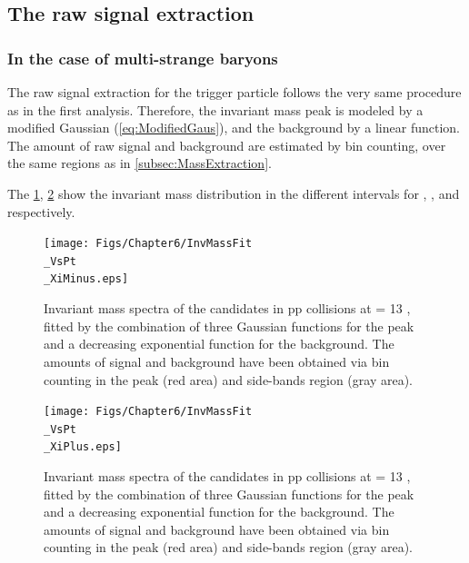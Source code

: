 \subsection{The raw signal extraction}
\label{subsec:CascadeResonanceSignalExtraction}

\subsubsection{In the case of multi-strange baryons}

The raw signal extraction for the trigger particle follows the very same procedure as in the first analysis. Therefore, the invariant mass peak is modeled by a modified Gaussian (\eq\ref{eq:ModifiedGaus}), and the background by a linear function. The amount of raw signal and background are estimated by bin counting, over the same regions as in \Sec\ref{subsec:MassExtraction}. 

The \figs\ref{fig:InvMassXiMinusVPt}, \ref{fig:InvMassXiPlusVPt} show the invariant mass distribution in the different \pT intervals for \rmXiM, \rmAxiP, \rmOmegaM and \rmAomegaP respectively.

\begin{landscape}
\begin{figure}[h]
	\centering
	\texttt{[image: Figs/Chapter6/InvMassFit\\\_VsPt\\\_XiMinus.eps]}
\caption{Invariant mass spectra of the \rmXiM candidates in pp collisions at \sqrtS = 13 \tev, fitted by the combination of three Gaussian functions for the peak and a decreasing exponential function for the background. The amounts of signal and background have been obtained via bin counting in the peak (red area) and side-bands region (gray area).}
	\label{fig:InvMassXiMinusVPt}
\end{figure}

\begin{figure}[h]
	\centering
	\texttt{[image: Figs/Chapter6/InvMassFit\\\_VsPt\\\_XiPlus.eps]}
\caption{Invariant mass spectra of the \rmAxiP candidates in pp collisions at \sqrtS = 13 \tev, fitted by the combination of three Gaussian functions for the peak and a decreasing exponential function for the background. The amounts of signal and background have been obtained via bin counting in the peak (red area) and side-bands region (gray area).}
	\label{fig:InvMassXiPlusVPt}
\end{figure}

\end{landscape}

